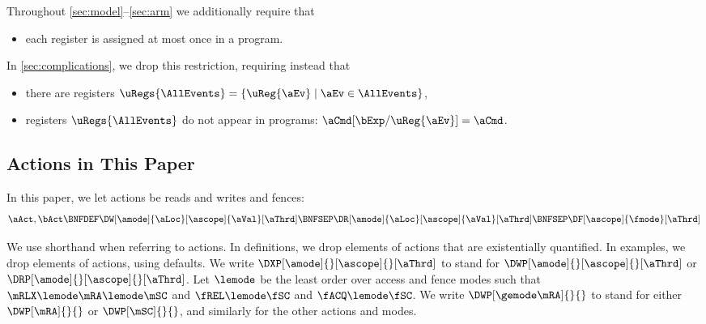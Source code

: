 Throughout \textsection\ref{sec:model}--\ref{sec:arm} we 
additionally require that
\begin{itemize}
\item each register is assigned at most once in a program.
\end{itemize}
In \textsection\ref{sec:complications}, we drop this restriction, requiring
instead that
\begin{itemize}
\item there are registers
  $\uRegs{\AllEvents}=\{\uReg{\aEv}\mid\aEv\in\AllEvents\}$,
\item registers $\uRegs{\AllEvents}$ do not appear in programs: $\aCmd[\bExp/\uReg{\aEv}]=\aCmd$.
\end{itemize}


\subsection{Actions in This Paper}

In this paper, we let actions be reads and writes and fences:
\begin{displaymath}
  \aAct,\bAct \BNFDEF \DW[\amode]{\aLoc}[\ascope]{\aVal}[\aThrd]
  \BNFSEP \DR[\amode]{\aLoc}[\ascope]{\aVal}[\aThrd]
  \BNFSEP \DF[\ascope]{\fmode}[\aThrd]
\end{displaymath}

We use shorthand when referring to actions.  In definitions, we drop elements
of actions that are existentially quantified.  In examples, we drop elements
of actions, using defaults.  We write $\DXP[\amode]{}[\ascope]{}[\aThrd]$ to
stand for $\DWP[\amode]{}[\ascope]{}[\aThrd]$ or
$\DRP[\amode]{}[\ascope]{}[\aThrd]$.
%
Let $\lemode$ be the least order over access and fence modes such that
$\mRLX\lemode\mRA\lemode\mSC$ and $\fREL\lemode\fSC$ and $\fACQ\lemode\fSC$.
We write $\DWP[\gemode\mRA]{}{}$ to stand for either $\DWP[\mRA]{}{}$ or
$\DWP[\mSC]{}{}$, and similarly for the other actions and modes.

